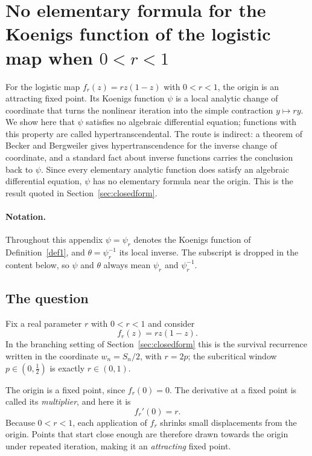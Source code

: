 \documentclass[11pt]{article}
\begin{document}
\appendix


\section[No elementary formula for the Koenigs function of the logistic map when\texorpdfstring{\protect\\}{ }$0<r<1$]{No elementary formula for the Koenigs function of the logistic map when \texorpdfstring{$0<r<1$}{0 < r < 1}}
\label{app:hyper}

For the logistic map $f_r(z)=rz(1-z)$ with $0<r<1$, the origin is an attracting fixed point. Its Koenigs function $\psi$ is a local analytic change of coordinate that turns the nonlinear iteration into the simple contraction $y\mapsto ry$. We show here that $\psi$ satisfies no algebraic differential equation; functions with this property are called hypertranscendental. The route is indirect: a theorem of Becker and Bergweiler gives hypertranscendence for the inverse change of coordinate, and a standard fact about inverse functions carries the conclusion back to $\psi$. Since every elementary analytic function does satisfy an algebraic differential equation, $\psi$ has no elementary formula near the origin. This is the result quoted in Section~\ref{sec:closedform}.

\paragraph{Notation.} Throughout this appendix $\psi=\psi_r$ denotes the Koenigs function of Definition~\ref{def1}, and $\theta=\psi_r^{-1}$ its local inverse. The subscript is dropped in the content below, so $\psi$ and $\theta$ always mean $\psi_r$ and $\psi_r^{-1}$.

\subsection{The question}

Fix a real parameter $r$ with $0<r<1$ and consider
\begin{equation}
 f_r(z)=rz(1-z).
\end{equation}
In the branching setting of Section~\ref{sec:closedform} this is the survival recurrence written in the coordinate $w_n=S_n/2$, with $r=2p$; the subcritical window $p\in(0,\tfrac12)$ is exactly $r\in(0,1)$.

The origin is a fixed point, since $f_r(0)=0$. The derivative at a fixed point is called its \emph{multiplier}, and here it is
\[
 f_r'(0)=r.
\]
Because $0<r<1$, each application of $f_r$ shrinks small displacements from the origin. Points that start close enough are therefore drawn towards the origin under repeated iteration, making it an \emph{attracting} fixed point.
\end{document}
